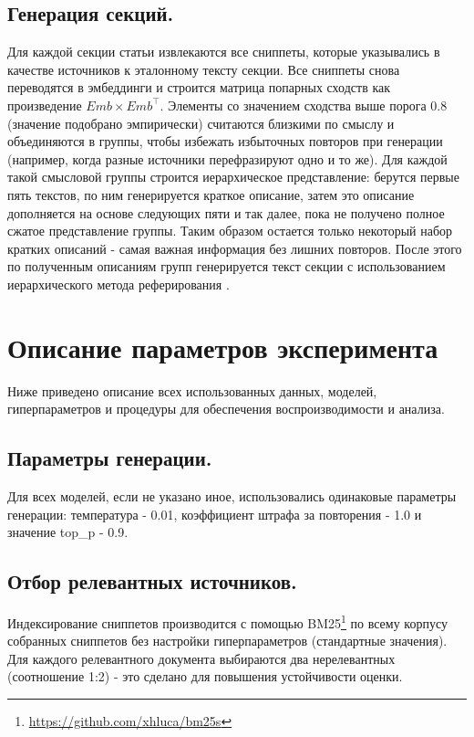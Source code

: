 \documentclass{article}
\begin{document}
\subsection*{Генерация секций.}
Для каждой секции статьи извлекаются все сниппеты, которые указывались в качестве источников к эталонному тексту секции. 
Все сниппеты снова переводятся в эмбеддинги и строится матрица попарных сходств как произведение \(Emb \times Emb^\top\).
Элементы со значением сходства выше порога 0.8 (значение подобрано эмпирически) считаются близкими по смыслу и объединяются в группы, 
чтобы избежать избыточных повторов при генерации (например, когда разные источники перефразируют одно и то же). 
Для каждой такой смысловой группы строится иерархическое представление: берутся первые пять текстов, по ним генерируется краткое описание, 
затем это описание дополняется на основе следующих пяти и так далее, пока не получено полное сжатое представление группы.
Таким образом остается только некоторый набор кратких описаний - самая важная информация без лишних повторов.
После этого по полученным описаниям групп генерируется текст секции с использованием иерархического метода реферирования \cite{hier}.

\section*{Описание параметров эксперимента}
Ниже приведено описание всех использованных данных, моделей, гиперпараметров и процедуры для обеспечения воспроизводимости и анализа.

\subsection*{Параметры генерации.}
Для всех моделей, если не указано иное, использовались одинаковые параметры генерации: температура - 0.01, коэффициент штрафа за повторения - 1.0 и значение top\_p - 0.9.

\subsection*{Отбор релевантных источников.}
Индексирование сниппетов производится с помощью BM25\footnote{\url{https://github.com/xhluca/bm25s}} по всему корпусу собранных сниппетов без настройки гиперпараметров (стандартные значения).
Для каждого релевантного документа выбираются два нерелевантных (соотношение 1:2) - это сделано для повышения устойчивости оценки.
\end{document}
